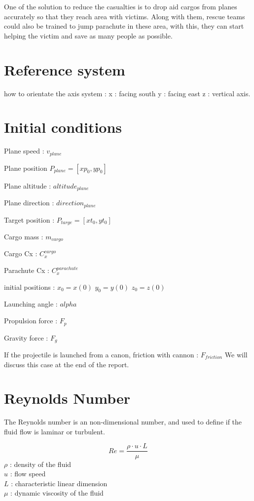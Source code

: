 \documentclass[12pt,a4paper]{article}
\begin{document}
One of the solution to reduce the casualties is to drop aid cargos from planes accurately so that they reach area with victims. 
Along with them, rescue teams could also be trained to jump parachute in these area, with this, they can start helping the victim and save as many people as possible. 

\section{Reference system}
how to orientate the axis system : 
x : facing south
y : facing east
z : vertical axis. 

\section{Initial conditions}

Plane speed : $v_{plane}$

Plane position $P_{plane}= [xp_0, yp_0]$

Plane altitude : $altitude_{plane}$

Plane direction : $direction_{plane}$

Target position : $P_{targe} = [xt_0, yt_0]$ 

Cargo mass : $m_{cargo}$

Cargo Cx : $C_x^{cargo}$

Parachute Cx : $C_x^{parachute}$

initial positions : 
$x_0 = x(0)$ 
$y_0 = y(0)$ 
$z_0 = z(0)$

Launching angle : $alpha$

Propulsion force : $F_p$

Gravity force : $F_g$

If the projectile is launched from a canon, 
friction with cannon : $F_{friction}$
We will discuss this case at the end of the report. 



\section{Reynolds Number}
The Reynolds number is an non-dimensional number, and used to define if the fluid flow is laminar or turbulent. 

\begin{equation}
	Re = \frac{\rho \cdot u \cdot L}{\mu}
\end{equation}
$\rho$ : density of the fluid\\
$u$ : flow speed\\
$L$ : characteristic linear dimension\\
$\mu$ : dynamic viscosity of the fluid\\
\end{document}
